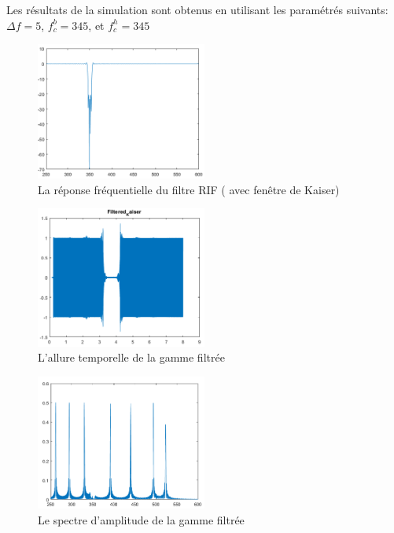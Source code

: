 \documentclass[twoside,twocolumn]{article}
\begin{document}
\label{matlab}

 
 Les résultats de la simulation sont obtenus en utilisant les paramétrés suivants:
 $\Delta f = 5$, 
$ f_c^b = 345 $, et 
$ f_c^h = 345 $ \\
\begin{figure}[H]
\centering
\includegraphics[width=0.5\textwidth]{Images/18.png}
\caption{ La réponse fréquentielle du filtre RIF ( avec fenêtre de Kaiser)}
\end{figure} 
 
\begin{figure}[H]
\centering
\includegraphics[width=0.5\textwidth]{Images/19.png}
\caption{ L'allure temporelle de la gamme filtrée }
\end{figure}

\begin{figure}[H]
\centering
\includegraphics[width=0.5\textwidth]{Images/20.png}
\caption{ Le spectre d'amplitude de la gamme filtrée}
\end{figure}
\end{document}
